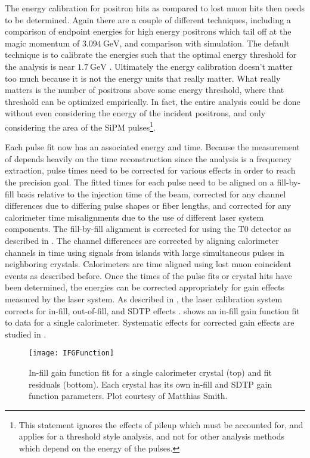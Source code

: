The energy calibration for positron hits as compared to lost muon hits then needs to be determined. Again there are a couple of different techniques, including a comparison of endpoint energies for high energy positrons which tail off at the magic momentum of $\SI{3.094}{\GeV}$, and comparison with simulation. The default technique is to calibrate the energies such that the optimal energy threshold for the \wa analysis is near $\SI{1.7}{\GeV}$ \cite{AFThesis}. Ultimately the energy calibration doesn't matter too much because it is not the energy units that really matter. What really matters is the number of positrons above some energy threshold, where that threshold can be optimized empirically. In fact, the entire \wa analysis could be done without even considering the energy of the incident positrons, and only considering the area of the SiPM pulses\footnote{This statement ignores the effects of pileup which must be accounted for, and applies for a threshold style analysis, and not for other analysis methods which depend on the energy of the pulses.}.


Each pulse fit now has an associated energy and time. Because the measurement of \wa depends heavily on the time reconstruction since the analysis is a frequency extraction, pulse times need to be corrected for various effects in order to reach the precision goal. The fitted times for each pulse need to be aligned on a fill-by-fill basis relative to the injection time of the beam, corrected for any channel differences due to differing pulse shapes or fiber lengths, and corrected for any calorimeter time misalignments due to the use of different laser system components. The fill-by-fill alignment is corrected for using the T0 detector as described in . The channel differences are corrected by aligning calorimeter channels in time using signals from islands with large simultaneous pulses in neighboring crystals. Calorimeters are time aligned using lost muon coincident events as described before. Once the times of the pulse fits or crystal hits have been determined, the energies can be corrected appropriately for gain effects measured by the laser system. As described in , the laser calibration system corrects for in-fill, out-of-fill, and SDTP effects \cite{Gain}.  shows an in-fill gain function fit to data for a single calorimeter. Systematic effects for corrected gain effects are studied in . 

\begin{figure}[]
    \centering
    \texttt{[image: IFGFunction]}
    \caption[In-fill gain function fit for a single calorimeter crystal]{In-fill gain function fit for a single calorimeter crystal (top) and fit residuals (bottom). Each crystal has its own in-fill and SDTP gain function parameters. Plot courtesy of Matthias Smith.}
    \label{fig:IFGFunction}
\end{figure}


